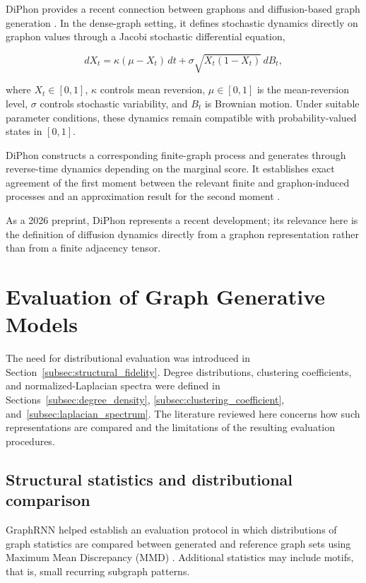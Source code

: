 DiPhon provides a recent connection between graphons and diffusion-based graph generation \cite{rozada2026diphon}. In the dense-graph setting, it defines stochastic dynamics directly on graphon values through a Jacobi stochastic differential equation,

\[
dX_t
=
\kappa(\mu-X_t)\,dt
+
\sigma
\sqrt{X_t(1-X_t)}
\,dB_t,
\]

where \(X_t\in[0,1]\), \(\kappa\) controls mean reversion, \(\mu\in[0,1]\) is the mean-reversion level, \(\sigma\) controls stochastic variability, and \(B_t\) is Brownian motion. Under suitable parameter conditions, these dynamics remain compatible with probability-valued states in \([0,1]\).

DiPhon constructs a corresponding finite-graph process and generates through reverse-time dynamics depending on the marginal score. It establishes exact agreement of the first moment between the relevant finite and graphon-induced processes and an approximation result for the second moment \cite{rozada2026diphon}.

As a 2026 preprint, DiPhon represents a recent development; its relevance here is the definition of diffusion dynamics directly from a graphon representation rather than from a finite adjacency tensor.


\section{Evaluation of Graph Generative Models}
\label{sec:rw_evaluation}

The need for distributional evaluation was introduced in Section~\ref{subsec:structural_fidelity}. Degree distributions, clustering coefficients, and normalized-Laplacian spectra were defined in Sections~\ref{subsec:degree_density}, \ref{subsec:clustering_coefficient}, and~\ref{subsec:laplacian_spectrum}. The literature reviewed here concerns how such representations are compared and the limitations of the resulting evaluation procedures.


\subsection{Structural statistics and distributional comparison}
\label{subsec:rw_structural_evaluation}

GraphRNN helped establish an evaluation protocol in which distributions of graph statistics are compared between generated and reference graph sets using Maximum Mean Discrepancy (MMD) \cite{you2018graphrnn}. Additional statistics may include motifs, that is, small recurring subgraph patterns.

